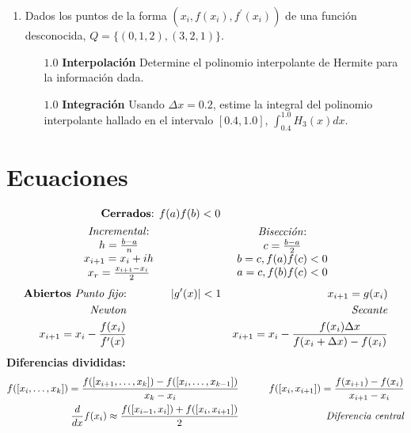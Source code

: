 \documentclass[12pt]{article}
\begin{document}
\begin{enumerate}[leftmargin=*,widest=9]
    \item Dados los puntos de la forma $(x_i, f(x_i), f^\prime (x_i))$ de una función desconocida, $Q=\lbrace (0, 1, 2), (3, 2, 1) \rbrace$.
    \begin{itemize}
    \item[$1.0$] \textbf{Interpolación} Determine el polinomio interpolante de Hermite para la información dada.
    \vspace{5cm}
    \item[$1.0$] \textbf{Integración} Usando $\Delta x = 0.2$, estime la integral del polinomio interpolante hallado en el intervalo $\left[0.4, 1.0\right]$, $\int_{0.4}^{1.0} H_{3}(x)dx$.
    \end{itemize}
    
  \end{enumerate}
  \clearpage
  \section*{Ecuaciones}
\begin{align*}
  \text{\textbf{Cerrados}: } & f(a)f(b)<0 &  \\
  \begin{array}{c}
  \text{\textit{Incremental}:}\\
  h = \frac{b-a}{n} \\
  x_{i+1} = x_i + ih\\
  x_r = \frac{x_{i+1}-x_i}{2}
  \end{array}
  & \qquad \qquad &
  \begin{array}{c}
  \text{\textit{Bisección}:}\\
  c = \frac{b-a}{2}\\
  b = c, f(a)f(c)<0\\
  a = c, f(b)f(c)<0
  \end{array}
\end{align*}
\begin{align*}
  \text{\textbf{Abiertos} \textit{Punto fijo}:}& \qquad \qquad |g^\prime (x)| < 1 & x_{i+1} = g(x_i) \\
  \text{\textit{Newton}} & & \text{\textit{Secante}} \\
  x_{i+1} = x_i - \frac{f(x_i)}{f^\prime(x)} & \qquad \qquad &
    x_{i+1} = x_i - \frac{f(x_i)\Delta x}{f(x_i+\Delta x)-f(x_i)}
\end{align*}
  \textbf{Diferencias divididas:}
  \begin{align*}
  f([x_i, \ldots, x_k]) = \frac{f([x_{i+1}, \ldots, x_k]) - f([x_i, \ldots, x_{k-1}])}{x_k - x_i} & \qquad & f([x_i, x_{i+1}])  =  \frac{f(x_{i+1})-f(x_i)}{x_{i+1}-x_i} \\
  \frac{d}{dx}f(x_i) \approx \frac{f([x_{i-1}, x_i])+f([x_{i}, x_{i+1}])}{2} & & \text{ \textit{Diferencia central}}
  \end{align*}
\end{document}
